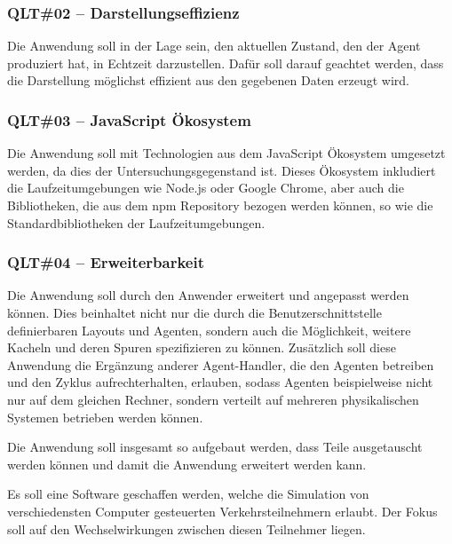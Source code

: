 \subsubsection{QLT\#02 – Darstellungseffizienz} \label{qlt:rendering_efficiency}

Die Anwendung soll in der Lage sein, den aktuellen Zustand, den der Agent produziert hat, in Echtzeit darzustellen.
Dafür soll darauf geachtet werden, dass die Darstellung möglichst effizient aus den gegebenen Daten erzeugt wird.

\subsubsection{QLT\#03 – JavaScript Ökosystem} \label{qlt:js_ecosystem}

Die Anwendung soll mit Technologien aus dem JavaScript Ökosystem umgesetzt werden, da dies der Untersuchungsgegenstand ist.
Dieses Ökosystem inkludiert die Laufzeitumgebungen wie Node.js oder Google Chrome, aber auch die Bibliotheken, die aus dem npm Repository bezogen werden können, so wie die Standardbibliotheken der Laufzeitumgebungen.

\subsubsection{QLT\#04 – Erweiterbarkeit} \label{qlt:extendability}

Die Anwendung soll durch den Anwender erweitert und angepasst werden können.
Dies beinhaltet nicht nur die durch die Benutzerschnittstelle definierbaren Layouts und Agenten, sondern auch die Möglichkeit, weitere Kacheln und deren Spuren spezifizieren zu können.
Zusätzlich soll diese Anwendung die Ergänzung anderer Agent-Handler, die den Agenten betreiben und den Zyklus aufrechterhalten, erlauben, sodass Agenten beispielweise nicht nur auf dem gleichen Rechner, sondern verteilt auf mehreren physikalischen Systemen betrieben werden können.

Die Anwendung soll insgesamt so aufgebaut werden, dass Teile ausgetauscht werden können und damit die Anwendung erweitert werden kann.

\iffalse
Es soll eine Software geschaffen werden, welche die Simulation von verschiedensten Computer gesteuerten Verkehrsteilnehmern erlaubt.
Der Fokus soll auf den Wechselwirkungen zwischen diesen Teilnehmer liegen.

